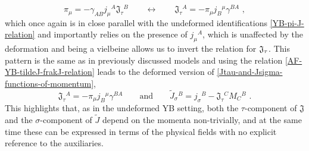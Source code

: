 \documentclass[12pt]{article}
\numberwithin{equation}{section}
\begin{document}
\begin{equation}\label{AF-YB-pi-frakJ-relation}
\pi_{\mu}=-\gamma_{AB}j_{\mu}{}^{A}\mathfrak{J}_{\tau}{}^{B}
\qquad \longleftrightarrow \qquad
\mathfrak{J}_{\tau}{}^{A}=-\pi_{\mu}j_{B}{}^{\mu}\gamma^{BA} \,\, ,
\end{equation}
which once again is in close parallel with the undeformed identifications \eqref{YB-pi-J-relation} and importantly relies on the presence of $j_{\mu}{}^{A}$, which is unaffected by the deformation and being a vielbeine allows us to invert the relation for $\frak{J}_{\tau}$. This pattern is the same as in previously discussed models and using the relation \eqref{AF-YB-tildeJ-frakJ-relation} leads to the deformed version of \eqref{Jtau-and-Jsigma-functions-of-momentum},
\begin{equation}\label{AF-YB-Jtau-and-Jsigma-functions-of-momentum}
\mathfrak{J}_{\tau}{}^{A}=-\pi_{\mu}j_{B}{}^{\mu}\gamma^{BA} 
\qquad \text{and} \qquad 
\tilde{J}_{\sigma}{}^{B}=j_{\sigma}{}^{B}-\mathfrak{J}_{\tau}{}^{C}M_{C}{^{B}} \,\, .
\end{equation}
This highlights that, as in the undeformed YB setting, both the $\tau$-component of $\mathfrak{J}$ and the $\sigma$-component of $\tilde{J}$ depend on the momenta non-trivially, and at the same time these can be expressed in terms of the physical fields with no explicit reference to the auxiliaries.
\end{document}
